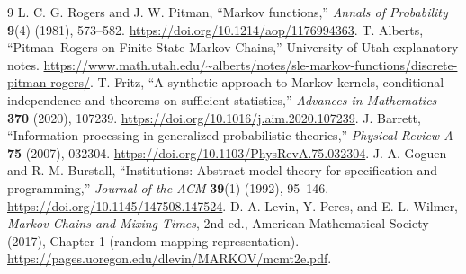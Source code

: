 \documentclass[11pt,letterpaper]{article}
\theoremstyle{definition}\newtheorem{definition}[theorem]{Definition}
\theoremstyle{remark}\newtheorem{remark}[theorem]{Remark}
\begin{document}
\begin{thebibliography}{9}
 L. C. G. Rogers and J. W. Pitman, ``Markov functions,'' \emph{Annals of Probability} \textbf{9}(4) (1981), 573--582. \url{https://doi.org/10.1214/aop/1176994363}.
 T. Alberts, ``Pitman--Rogers on Finite State Markov Chains,'' University of Utah explanatory notes. \url{https://www.math.utah.edu/~alberts/notes/sle-markov-functions/discrete-pitman-rogers/}.
 T. Fritz, ``A synthetic approach to Markov kernels, conditional independence and theorems on sufficient statistics,'' \emph{Advances in Mathematics} \textbf{370} (2020), 107239. \url{https://doi.org/10.1016/j.aim.2020.107239}.
 J. Barrett, ``Information processing in generalized probabilistic theories,'' \emph{Physical Review A} \textbf{75} (2007), 032304. \url{https://doi.org/10.1103/PhysRevA.75.032304}.
 J. A. Goguen and R. M. Burstall, ``Institutions: Abstract model theory for specification and programming,'' \emph{Journal of the ACM} \textbf{39}(1) (1992), 95--146. \url{https://doi.org/10.1145/147508.147524}.
 D. A. Levin, Y. Peres, and E. L. Wilmer, \emph{Markov Chains and Mixing Times}, 2nd ed., American Mathematical Society (2017), Chapter 1 (random mapping representation). \url{https://pages.uoregon.edu/dlevin/MARKOV/mcmt2e.pdf}.
\end{thebibliography}
\end{document}

